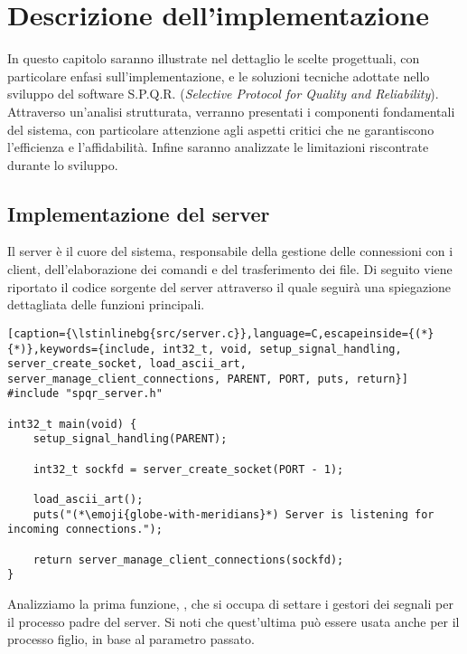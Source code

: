\chapter{Descrizione dell'implementazione}

In questo capitolo saranno illustrate nel dettaglio le scelte progettuali, con particolare enfasi sull'implementazione, e le soluzioni tecniche adottate nello sviluppo del software S.P.Q.R. (\textit{Selective Protocol for Quality and Reliability}).
Attraverso un'analisi strutturata, verranno presentati i componenti fondamentali del sistema, con particolare attenzione agli aspetti critici che ne garantiscono l'efficienza e l'affidabilità.
Infine saranno analizzate le limitazioni riscontrate durante lo sviluppo.

\section{Implementazione del server}
Il server è il cuore del sistema, responsabile della gestione delle connessioni con i client, dell'elaborazione dei comandi e del trasferimento dei file.
Di seguito viene riportato il codice sorgente del server attraverso il quale seguirà una spiegazione dettagliata delle funzioni principali.

\begin{lstlisting}[caption={\lstinlinebg{src/server.c}},language=C,escapeinside={(*}{*)},keywords={include, int32_t, void, setup_signal_handling, server_create_socket, load_ascii_art, server_manage_client_connections, PARENT, PORT, puts, return}]
#include "spqr_server.h"

int32_t main(void) {
    setup_signal_handling(PARENT);
    
    int32_t sockfd = server_create_socket(PORT - 1);
    
    load_ascii_art();
    puts("(*\emoji{globe-with-meridians}*) Server is listening for incoming connections.");
    
    return server_manage_client_connections(sockfd);
}
\end{lstlisting}

Analizziamo la prima funzione, , che si occupa di settare i gestori dei segnali per il processo padre del server.
Si noti che quest'ultima può essere usata anche per il processo figlio, in base al parametro passato.

